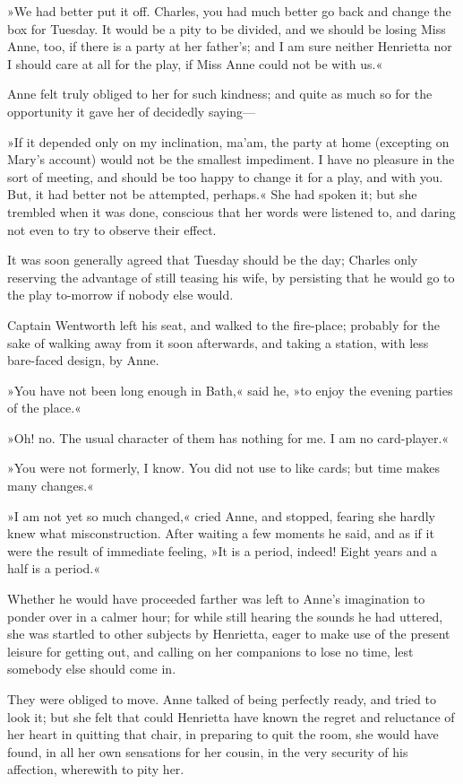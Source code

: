 »We had better put it off. Charles, you had much better go back and change the box for Tuesday. It would be a pity to be divided, and we should be losing Miss Anne, too, if there is a party at her father's; and I am sure neither Henrietta nor I should care at all for the play, if Miss Anne could not be with us.«

Anne felt truly obliged to her for such kindness; and quite as much so for the opportunity it gave her of decidedly saying—

»If it depended only on my inclination, ma'am, the party at home (excepting on Mary's account) would not be the smallest impediment. I have no pleasure in the sort of meeting, and should be too happy to change it for a play, and with you. But, it had better not be attempted, perhaps.« She had spoken it; but she trembled when it was done, conscious that her words were listened to, and daring not even to try to observe their effect.

It was soon generally agreed that Tuesday should be the day; Charles only reserving the advantage of still teasing his wife, by persisting that he would go to the play to-morrow if nobody else would.

Captain Wentworth left his seat, and walked to the fire-place; probably for the sake of walking away from it soon afterwards, and taking a station, with less bare-faced design, by Anne.

»You have not been long enough in Bath,« said he, »to enjoy the evening parties of the place.«

»Oh! no. The usual character of them has nothing for me. I am no card-player.«

»You were not formerly, I know. You did not use to like cards; but time makes many changes.«

»I am not yet so much changed,« cried Anne, and stopped, fearing she hardly knew what misconstruction. After waiting a few moments he said, and as if it were the result of immediate feeling, »It is a period, indeed! Eight years and a half is a period.«

Whether he would have proceeded farther was left to Anne's imagination to ponder over in a calmer hour; for while still hearing the sounds he had uttered, she was startled to other subjects by Henrietta, eager to make use of the present leisure for getting out, and calling on her companions to lose no time, lest somebody else should come in.

They were obliged to move. Anne talked of being perfectly ready, and tried to look it; but she felt that could Henrietta have known the regret and reluctance of her heart in quitting that chair, in preparing to quit the room, she would have found, in all her own sensations for her cousin, in the very security of his affection, wherewith to pity her.

